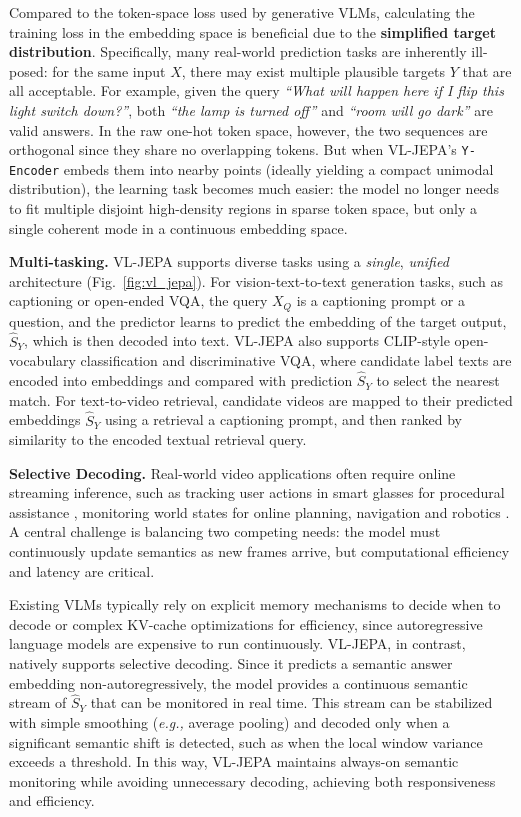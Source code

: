 Compared to the token-space loss used by generative VLMs, calculating the training loss in the embedding space is beneficial due to the \textbf{simplified target distribution}. Specifically, many real-world prediction tasks are inherently ill-posed: for the same input $X$, there may exist multiple plausible targets $Y$ that are all acceptable. For example, given the query \textit{``What will happen here if I flip this light switch down?''}, both \textit{``the lamp is turned off''} and \textit{``room will go dark''} are valid answers. In the raw one-hot token space, however, the two sequences are orthogonal since they share no overlapping tokens. But when VL-JEPA’s \texttt{Y-Encoder} embeds them into nearby points (ideally yielding a compact unimodal distribution), the learning task becomes much easier: the model no longer needs to fit multiple disjoint high-density regions in sparse token space, but only a single coherent mode in a continuous embedding space.

\textbf{Multi-tasking.} VL-JEPA supports diverse tasks using a \textit{single}, \textit{unified} architecture (Fig.~\ref{fig:vl_jepa}). For vision-text-to-text generation tasks, such as captioning or open-ended VQA, the query $X_Q$ is a captioning prompt or a question, and the predictor learns to predict the embedding of the target output, $\hat S_Y$, which is then decoded into text. {VL-JEPA also supports CLIP-style open-vocabulary classification and discriminative VQA}, where candidate label texts are encoded into embeddings and compared with prediction $\hat S_Y$ to select the nearest match. For text-to-video retrieval, candidate videos are mapped to their predicted embeddings $\hat S_Y$ using a retrieval a captioning prompt, and then ranked by similarity to the encoded textual retrieval query.

\textbf{Selective Decoding.} Real-world video applications often require online streaming inference, such as tracking user actions in smart glasses for procedural assistance \citep{chen2024videollm}, monitoring world states for online planning, navigation and robotics \citep{shukor2025smolvla, black2025real,song2025accelerating}. A central challenge is balancing two competing needs: the model must continuously update semantics as new frames arrive, but  computational efficiency and latency are critical. 

Existing VLMs typically rely on explicit memory mechanisms \citep{zhou2024streaming,qian2024streaming} to decide when to decode or complex KV-cache optimizations \citep{di2025streaming} for efficiency, since autoregressive language models are expensive to run continuously. 
% 
VL-JEPA, in contrast, natively supports selective decoding. Since it predicts a semantic answer embedding non-autoregressively, the model provides a continuous semantic stream of $\hat S_Y$ that can be monitored in real time. This stream can be stabilized with simple smoothing (\textit{e.g.,} average pooling) and decoded only when a significant semantic shift is detected, such as when the local window variance exceeds a threshold. In this way, VL-JEPA maintains always-on semantic monitoring while avoiding unnecessary decoding, achieving both responsiveness and efficiency.

